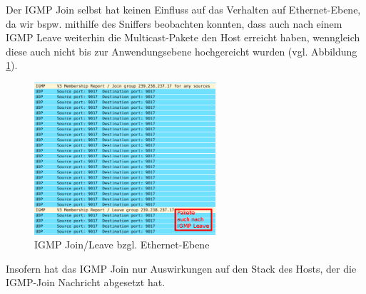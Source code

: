\documentclass[a4paper,10pt]{article}
\begin{document}
Der IGMP Join selbst hat keinen Einfluss auf das Verhalten auf Ethernet-Ebene,
da wir bspw. mithilfe des Sniffers beobachten konnten, 
dass auch nach einem IGMP Leave weiterhin die Multicast-Pakete den Host erreicht haben,
wenngleich diese auch nicht bis zur Anwendungsebene hochgereicht wurden (vgl. Abbildung \ref{multicast_after_leave}).

\begin{figure}[h]
	\begin{center}
		\includegraphics[width=0.6\textwidth]{multicast_after_leave.png}
	\end{center}

	\caption{IGMP Join/Leave bzgl. Ethernet-Ebene}

	\label{multicast_after_leave}
\end{figure}

Insofern hat das IGMP Join nur Auswirkungen auf den Stack des Hosts, 
der die IGMP-Join Nachricht abgesetzt hat.
\end{document}
